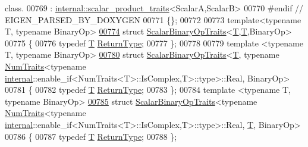 \begin{DoxyCode}
{{       class.}
00769   : \hyperlink{struct_eigen_1_1internal_1_1scalar__product__traits}{internal::scalar\_product\_traits}<ScalarA,ScalarB>
00770 \textcolor{preprocessor}{#endif // EIGEN\_PARSED\_BY\_DOXYGEN}
00771 \{\};
00772 
00773 \textcolor{keyword}{template}<\textcolor{keyword}{typename} T, \textcolor{keyword}{typename} BinaryOp>
\hyperlink{struct_eigen_1_1_scalar_binary_op_traits_3_01_t_00_01_t_00_01_binary_op_01_4}{00774} \textcolor{keyword}{struct }\hyperlink{group___core___module_struct_eigen_1_1_scalar_binary_op_traits}{ScalarBinaryOpTraits}<\hyperlink{group___sparse_core___module}{T},\hyperlink{group___sparse_core___module}{T},BinaryOp>
00775 \{
00776   \textcolor{keyword}{typedef} \hyperlink{group___sparse_core___module}{T} \hyperlink{group___sparse_core___module}{ReturnType};
00777 \};
00778 
00779 \textcolor{keyword}{template} <\textcolor{keyword}{typename} T, \textcolor{keyword}{typename} BinaryOp>
\hyperlink{struct_eigen_1_1_scalar_binary_op_traits_3_01_t_00_01typename_01_num_traits_3_01typename_01inter6d9b2ba43c8f599c26e1e5ea9727da7f}{00780} \textcolor{keyword}{struct }\hyperlink{group___core___module_struct_eigen_1_1_scalar_binary_op_traits}{ScalarBinaryOpTraits}<\hyperlink{group___sparse_core___module}{T}, typename \hyperlink{group___core___module_struct_eigen_1_1_num_traits}{NumTraits}<typename 
      \hyperlink{namespaceinternal}{internal}::enable\_if<NumTraits<T>::IsComplex,T>::type>::Real, BinaryOp>
00781 \{
00782   \textcolor{keyword}{typedef} \hyperlink{group___sparse_core___module}{T} \hyperlink{group___sparse_core___module}{ReturnType};
00783 \};
00784 \textcolor{keyword}{template} <\textcolor{keyword}{typename} T, \textcolor{keyword}{typename} BinaryOp>
\hyperlink{struct_eigen_1_1_scalar_binary_op_traits_3_01typename_01_num_traits_3_01typename_01internal_1_1e682c29bad5c4221eece44bbf2be041d0}{00785} \textcolor{keyword}{struct }\hyperlink{group___core___module_struct_eigen_1_1_scalar_binary_op_traits}{ScalarBinaryOpTraits}<typename \hyperlink{group___core___module_struct_eigen_1_1_num_traits}{NumTraits}<typename 
      \hyperlink{namespaceinternal}{internal}::enable\_if<NumTraits<T>::IsComplex,T>::type>::Real, \hyperlink{group___sparse_core___module}{T}, BinaryOp>
00786 \{
00787   \textcolor{keyword}{typedef} \hyperlink{group___sparse_core___module}{T} \hyperlink{group___sparse_core___module}{ReturnType};
00788 \};
}
\end{DoxyCode}
